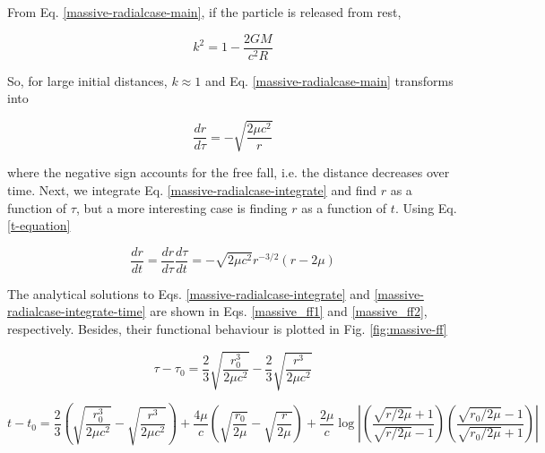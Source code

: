 \documentclass[letterpaper,11pt,onecolumn]{article}
\begin{document}
From Eq. \ref{massive-radialcase-main}, if the particle is released from rest, 

\begin{equation*}
    k^2 = 1 - \frac{2GM}{c^2 R}
\end{equation*}

So, for large initial distances, $k \approx 1$ and Eq. \ref{massive-radialcase-main} transforms into 

\begin{equation} \label{massive-radialcase-integrate}
    \frac{dr}{d\tau} = - \sqrt{\frac{2\mu c^2}{r}}
\end{equation}

where the negative sign accounts for the free fall, i.e. the distance decreases over time. Next, we integrate Eq. \ref{massive-radialcase-integrate} and find $r$ as a function of $\tau$, but a more interesting case is finding $r$ as a function of $t$. Using Eq. \ref{t-equation}

\begin{equation} \label{massive-radialcase-integrate-time}
    \frac{dr}{dt} = \frac{dr}{d\tau} \frac{d\tau}{dt} = - \sqrt{2\mu c^2} r^{-3/2} (r - 2\mu)
\end{equation}

The analytical solutions to Eqs. \ref{massive-radialcase-integrate} and \ref{massive-radialcase-integrate-time} are shown in Eqs. \ref{massive_ff1} and \ref{massive_ff2}, respectively. Besides, their functional behaviour is plotted in Fig. \ref{fig:massive-ff}

\begin{equation} \label{massive_ff1}
    \tau - \tau_0 = \frac23 \sqrt{\frac{r_0^3}{2\mu c^2}} -  \frac23 \sqrt{\frac{r^3}{2\mu c^2}} \label{28}
\end{equation}

\begin{equation} \label{massive_ff2}
    t - t_0 = \frac23 \left( \sqrt{\frac{r_0^3}{2\mu c^2}} - \sqrt{\frac{r^3}{2\mu c^2}} \right) + \frac{4 \mu}{c}  \left( \sqrt{\frac{r_0}{2\mu}} - \sqrt{\frac{r}{2\mu}} \right) + \frac{2\mu}{c} \log \left| \left( \frac{\sqrt{r/2\mu} + 1}{\sqrt{r/2\mu} - 1} \right) \left( \frac{\sqrt{r_0/2\mu} - 1}{\sqrt{r_0/2\mu} + 1} \right)  \right| \label{29}
\end{equation}
\end{document}
